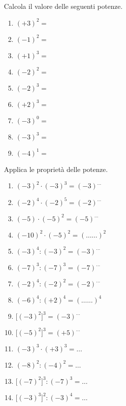 \begin{esercizio}
\label{ese:2.22}
Calcola il valore delle seguenti potenze.

\vspace{-1em}
\begin{multicols}{3}
 \begin{enumerate}[noitemsep, label=(\alph*)]
 \item \((+3)^2 =\)
 \item \((-1)^2 =\)
 \item \((+1)^3 =\)
 \item \((-2)^2 =\)
 \item \((-2)^3 =\)
 \item \((+2)^3 =\)
 \item \((-3)^0 =\)
 \item \((-3)^3 =\)
 \item \((-4)^1 =\)
 \end{enumerate}
 \end{multicols}
\end{esercizio}

\begin{esercizio}
\label{ese:2.23}
 Applica le proprietà delle potenze.
 
\vspace{-1em}
\begin{multicols}{2}
 \begin{enumerate}[noitemsep, label=(\alph*)]
 \item \((-3)^2\cdot(-3)^3 = (-3)^{\ldots}\)
 \item \((-2)^4\cdot(-2)^5 = (-2)^{\ldots}\)
 \item \((-5)\cdot(-5)^2 = (-5)^{\ldots}\)
 \item \((-10)^2\cdot(-5)^2 = (\ldots \ldots)^2\)
 \item \((-3)^4:(-3)^2 = (-3)^{\ldots}\)
 \item \((-7)^3:(-7)^3=(-7)^{\ldots}\)
 \item \((-2)^4:(-2)^2=(-2)^{\ldots}\)
 \item \((-6)^4:(+2)^4=(\ldots \ldots)^4\)
 \item \(\big[(-3)^2\big]^3 = (-3)^{\ldots}\)
 \item \(\big[(-5)^2\big]^3=(+5)^{\ldots}\)
 \item \((-3)^3\cdot(+3)^3 = \ldots\)
 \item \((-8)^2:(-4)^2= \ldots\)
 \item \(\big[(-7)^2\big]^3: (-7)^3 =\ldots\)
 \item \(\big[(-3)^3\big]^2: (-3)^4=\ldots\)
 \end{enumerate}
 \end{multicols}
\end{esercizio}

